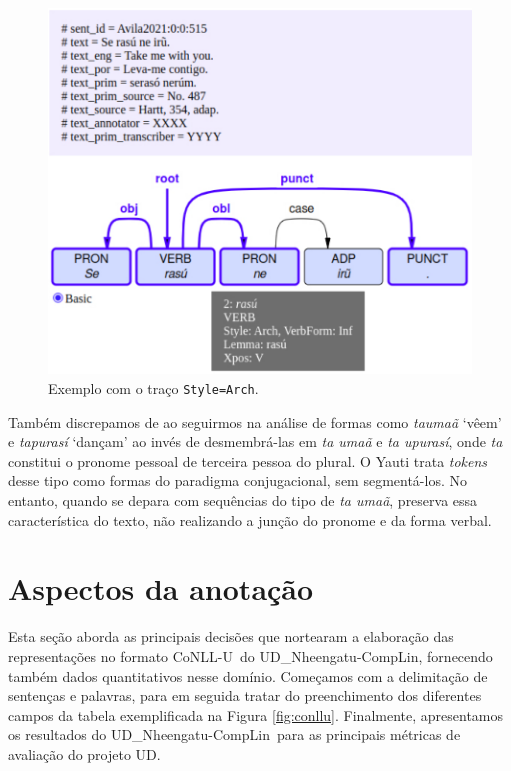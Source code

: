 \documentclass[portuguese]{textolivre}
\newcommand{\wt}[2]{\textit{#1} `#2'}
\newcommand{\tbc}{UD\_Nheengatu-CompLin}
\newcommand{\conll}{CoNLL-U}
\begin{document}
\begin{figure}[htbp]
  \centering
  \begin{minipage}{.75\textwidth}
    \includegraphics[width=\linewidth]{figures/style-arch.pdf}
    \caption{Exemplo com o traço \texttt{Style=Arch}.}
    \label{fig:style-arch}
  \end{minipage}
\end{figure}

Também discrepamos de \textcite{avila2021} ao seguirmos \textcite{cruz2011} na análise de formas como \wt{taumaã}{vêem} e \wt{tapurasí}{dançam} ao invés de desmembrá-las em \textit{ta umaã} e \textit{ta upurasí}, onde \textit{ta} constitui o pronome pessoal de terceira pessoa do plural. O Yauti trata \textit{tokens} desse tipo como formas do paradigma conjugacional, sem segmentá-los. No entanto, quando se depara com sequências do tipo de \textit{ta umaã}, preserva essa característica do texto, não realizando a junção do pronome e da forma verbal. 

\section{Aspectos da anotação}\label{sec:anotacao}
Esta seção aborda as principais decisões que nortearam a elaboração das representações no formato \conll~do \tbc, fornecendo também dados quantitativos nesse domínio. Começamos com a delimitação de sentenças e palavras, para em seguida tratar do preenchimento dos diferentes campos da tabela exemplificada na Figura \ref{fig:conllu}. Finalmente, apresentamos os resultados do \tbc~para as principais métricas de avaliação do projeto UD. 
\end{document}
